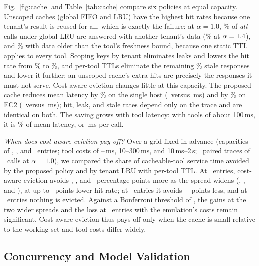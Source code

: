 \documentclass{ieeeaccess}
\newcommand{\ms}{\,ms\xspace}
\begin{document}
Fig.~\ref{fig:cache} and Table~\ref{tab:cache} compare six policies at equal capacity. Unscoped caches (global FIFO and LRU) have the highest hit rates because one tenant's result is reused for all, which is exactly the failure: at $\alpha = 1.0$, \cGlruLeak\% of \emph{all} calls under global LRU are answered with another tenant's data (\cGlruLeakHi\% at $\alpha = 1.4$), and \cGlruStale\% with data older than the tool's freshness bound, because one static TTL applies to every tool. Scoping keys by tenant eliminates leaks and lowers the hit rate from \cGlruHit\% to \cTlruHit\%, and per-tool TTLs eliminate the remaining \cTlruStale\% stale responses and lower it further; an unscoped cache's extra hits are precisely the responses it must not serve. Cost-aware eviction changes little at this capacity. The proposed cache reduces mean latency by \cPropLatGain\% on the single host (\cPropLat\ versus \cNoneLat\ms) and by \awCPropLatGain\% on EC2 (\awCPropLat\ versus \awCNoneLat\ms); hit, leak, and stale rates depend only on the trace and are identical on both. The saving grows with tool latency: with tools of about 100\ms, it is \hCPropLatGain\% of mean latency, or \hCPropSavedMs\ms per call.

\emph{When does cost-aware eviction pay off?} Over a grid fixed in advance (capacities of \senCapS, \senCapM, and \senCapB\ entries; tool costs of \senCurLo--\senCurHi\ms, 10--300\ms, and 10\ms--2\,s; \senSeeds\ paired traces of \senTrace\ calls at $\alpha = 1.0$), we compared the share of cacheable-tool service time avoided by the proposed policy and by tenant LRU with per-tool TTL. At \senCapS\ entries, cost-aware eviction avoids \senGainCur, \senGainMod, and \senGainWide\ percentage points more as the spread widens (\senPCur, \senPMod, and \senPWide), at up to \senHitLoss\ points lower hit rate; at \senCapM\ entries it avoids \senLossMin--\senLossMax\ points less, and at \senCapB\ entries nothing is evicted. Against a Bonferroni threshold of \senBonf, the gains at the two wider spreads and the loss at \senCapM\ entries with the emulation's costs remain significant. Cost-aware eviction thus pays off only when the cache is small relative to the working set and tool costs differ widely.

\subsection{Concurrency and Model Validation}
\label{sec:res-concurrency}


\end{document}
